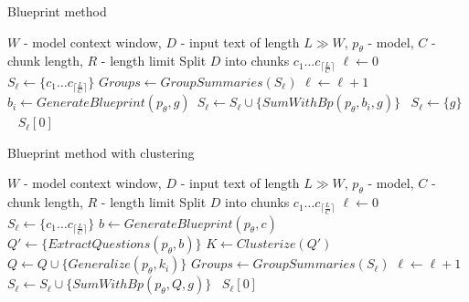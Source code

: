 \documentclass{superfri}
\begin{document}
\noindent
\begin{minipage}[t]{0.49\textwidth}
  \begin{algorithm}[H]
    \caption{Blueprint method}\label{alg:bl}
    \begin{algorithmic}
      \Require $W$ - model context window, $D$ - input text of length $L \gg W$, $p_\theta$ - model, $C$ - chunk length, $R$ - length limit
      \State Split $D$ into chunks $c_1\dots c_{\lceil \frac{L}{C} \rceil}$
      \State $\ell \gets 0$
      \State $S_\ell \gets \{c_1\dots c_{\lceil \frac{L}{C} \rceil}\}$
      \Repeat {}
        \State $Groups \gets GroupSummaries(S_\ell)$
        \State $\ell \gets \ell + 1$
            \State $b_i \gets GenerateBlueprint(p_\theta, g)$\
            \State $S_\ell \gets S_\ell \cup \{SumWithBp(p_\theta, b_i, g)\}$\
          \Else
            \State $S_\ell \gets \{g\}$\
          \EndIf
        \EndFor
      \Until{$|S_\ell|=1$}
      \State \Return $S_\ell[0]$
    \end{algorithmic}
  \end{algorithm}
\end{minipage}\hfill
\begin{minipage}[t]{0.49\textwidth}
  \begin{algorithm}[H]
  \caption{Blueprint method with clustering}\label{alg:bl_cl}
      \begin{algorithmic}
        \Require $W$ - model context window, $D$ - input text of length $L \gg W$, $p_\theta$ - model, $C$ - chunk length, $R$ - length limit
        \State Split $D$ into chunks $c_1\dots c_{\lceil \frac{L}{C} \rceil}$
        \State $\ell \gets 0$
        \State $S_\ell \gets \{c_1\dots c_{\lceil \frac{L}{C} \rceil}\}$
        \For{$c \in S_\ell$}
          \State $b \gets GenerateBlueprint(p_\theta, c)$
          \State $Q' \gets \{ExtractQuestions(p_\theta, b)\}$
        \EndFor
        \State $K \gets Clusterize(Q')$
        \For{$k_i \in K$}
          \State $Q  \gets Q \cup \{Generalize(p_\theta, k_i)\}$
        \EndFor
        \Repeat {}
        \State $Groups \gets GroupSummaries(S_\ell)$
        \State $\ell \gets \ell + 1$
        \For{$g \in Groups$}
          \State $S_\ell  \gets S_\ell \cup \{SumWithBp(p_\theta, Q, g)\}$\
        \EndFor
      \Until{$|S_\ell|=1$}
      \State \Return $S_\ell[0]$
      \end{algorithmic}
  \end{algorithm}
\end{minipage}
\end{document}
